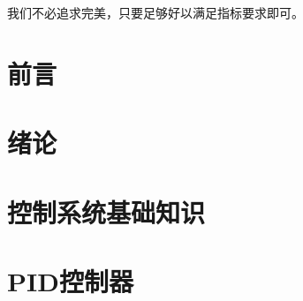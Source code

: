 \documentclass[12pt,a4paper]{book}
\newcommand{\notebody}{
	\chapter*{前言}
	

	\chapter{绪论}
	

	\chapter{控制系统基础知识}
	

	\chapter{PID控制器}
	

}
\begin{document}
	

	\newpage

	\thispagestyle{empty}
	\vspace*{\fill}
	\begin{center}
		{\kaishu\fontsize{18}{28}\selectfont 我们不必追求完美，只要足够好以满足指标要求即可。}
	\end{center}
	\vfill
	\newpage

	\pagestyle{mainstyle}

	\setcounter{tocdepth}{3}

	\tableofcontents

	\setcounter{page}{0}
	\thispagestyle{empty}
	\newpage
	\notebody
\end{document}
